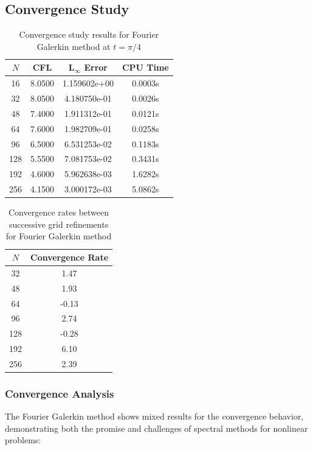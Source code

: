 \subsection{Convergence Study}
\begin{table}[h]
	\centering
	\begin{tabular}{|c|c|c|c|}
		\hline
		$N$ & CFL    & L$_\infty$ Error & CPU Time \\
		\hline
		16  & 8.0500 & 1.159602e+00     & 0.0003s  \\
		32  & 8.0500 & 4.180750e-01     & 0.0026s  \\
		48  & 7.4000 & 1.911312e-01     & 0.0121s  \\
		64  & 7.6000 & 1.982709e-01     & 0.0258s  \\
		96  & 6.5000 & 6.531253e-02     & 0.1183s  \\
		128 & 5.5500 & 7.081753e-02     & 0.3431s  \\
		192 & 4.6000 & 5.962638e-03     & 1.6282s  \\
		256 & 4.1500 & 3.000172e-03     & 5.0862s  \\
		\hline
	\end{tabular}
	\caption{Convergence study results for Fourier Galerkin method at $t = \pi/4$}
	\label{tab:convergence_galerkin}
\end{table}

\begin{table}[h]
	\centering
	\begin{tabular}{|c|c|}
		\hline
		$N$ & Convergence Rate \\
		\hline
		32  & 1.47             \\
		48  & 1.93             \\
		64  & -0.13            \\
		96  & 2.74             \\
		128 & -0.28            \\
		192 & 6.10             \\
		256 & 2.39             \\
		\hline
	\end{tabular}
	\caption{Convergence rates between successive grid refinements for Fourier Galerkin method}
	\label{tab:rates_galerkin}
\end{table}

\subsubsection{Convergence Analysis}
The Fourier Galerkin method shows mixed results for the convergence behavior, demonstrating both the promise and challenges of spectral methods for nonlinear problems:

